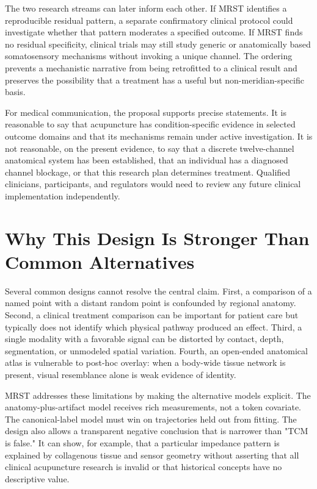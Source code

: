 \documentclass[conference]{IEEEtran}
\begin{document}
The two research streams can later inform each other. If MRST identifies a reproducible residual pattern, a separate confirmatory clinical protocol could investigate whether that pattern moderates a specified outcome. If MRST finds no residual specificity, clinical trials may still study generic or anatomically based somatosensory mechanisms without invoking a unique channel. The ordering prevents a mechanistic narrative from being retrofitted to a clinical result and preserves the possibility that a treatment has a useful but non-meridian-specific basis.

For medical communication, the proposal supports precise statements. It is reasonable to say that acupuncture has condition-specific evidence in selected outcome domains and that its mechanisms remain under active investigation. It is not reasonable, on the present evidence, to say that a discrete twelve-channel anatomical system has been established, that an individual has a diagnosed channel blockage, or that this research plan determines treatment. Qualified clinicians, participants, and regulators would need to review any future clinical implementation independently.

\section{Why This Design Is Stronger Than Common Alternatives}

Several common designs cannot resolve the central claim. First, a comparison of a named point with a distant random point is confounded by regional anatomy. Second, a clinical treatment comparison can be important for patient care but typically does not identify which physical pathway produced an effect. Third, a single modality with a favorable signal can be distorted by contact, depth, segmentation, or unmodeled spatial variation. Fourth, an open-ended anatomical atlas is vulnerable to post-hoc overlay: when a body-wide tissue network is present, visual resemblance alone is weak evidence of identity.

MRST addresses these limitations by making the alternative models explicit. The anatomy-plus-artifact model receives rich measurements, not a token covariate. The canonical-label model must win on trajectories held out from fitting. The design also allows a transparent negative conclusion that is narrower than "TCM is false." It can show, for example, that a particular impedance pattern is explained by collagenous tissue and sensor geometry without asserting that all clinical acupuncture research is invalid or that historical concepts have no descriptive value.
\end{document}
